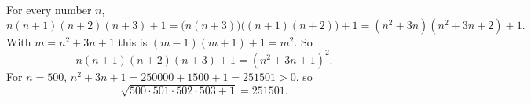 For every number $n$,
\[n(n+1)(n+2)(n+3)+1=\bigl(n(n+3)\bigr)\bigl((n+1)(n+2)\bigr)+1=(n^2+3n)(n^2+3n+2)+1.\]
With $m=n^2+3n+1$ this is $(m-1)(m+1)+1=m^2$. So
\[n(n+1)(n+2)(n+3)+1=(n^2+3n+1)^2.\]
For $n=500$, $n^2+3n+1=250000+1500+1=251501>0$, so
\[\sqrt{500\cdot501\cdot502\cdot503+1}=\boxed{251501}.\]
